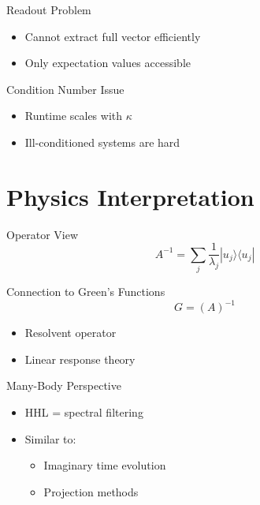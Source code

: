 \documentclass{beamer}
\begin{document}
\begin{frame}{Readout Problem}
\begin{itemize}
\item Cannot extract full vector efficiently
\item Only expectation values accessible
\end{itemize}
\end{frame}


\begin{frame}{Condition Number Issue}
\begin{itemize}
\item Runtime scales with $\kappa$
\item Ill-conditioned systems are hard
\end{itemize}
\end{frame}

\section{Physics Interpretation}

\begin{frame}{Operator View}
\[
A^{-1} = \sum_j \frac{1}{\lambda_j} |u_j\rangle \langle u_j|
\]
\end{frame}


\begin{frame}{Connection to Green's Functions}
\[
G = (A)^{-1}
\]
\begin{itemize}
\item Resolvent operator
\item Linear response theory
\end{itemize}
\end{frame}


\begin{frame}{Many-Body Perspective}
\begin{itemize}
\item HHL = spectral filtering
\item Similar to:
\begin{itemize}
\item Imaginary time evolution
\item Projection methods
\end{itemize}
\end{itemize}
\end{frame}
\end{document}

